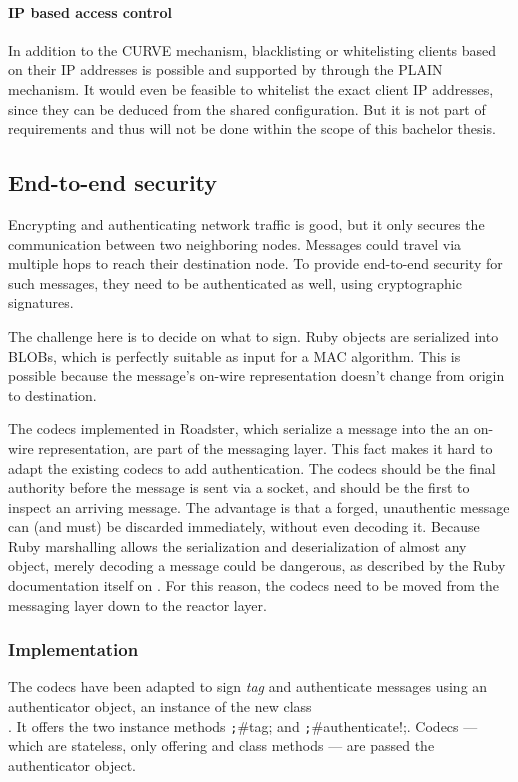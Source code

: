 \paragraph{IP based access control}
In addition to the CURVE mechanism, blacklisting or whitelisting clients based
on their \gls{IP} addresses is possible and supported by
 through the PLAIN mechanism. It would even be
feasible to whitelist the exact client IP addresses, since they can be deduced
from the shared configuration. But it is not part of requirements and thus will not
be done within the scope of this bachelor thesis.


\subsection{End-to-end security}
Encrypting and authenticating network traffic is good, but it only secures the
communication between two neighboring nodes. Messages could travel via multiple
hops to reach their destination node. To provide end-to-end security for such
messages, they need to be authenticated as well, using cryptographic
signatures.

The challenge here is to decide on what to sign. Ruby objects are serialized
into \glspl{BLOB}, which is perfectly suitable as input for a \gls{MAC} algorithm.
This is possible because the message's on-wire
representation doesn't change from origin to destination.

The codecs implemented in Roadster, which serialize a message into the an
on-wire representation, are part of the messaging layer. This fact makes it
hard to adapt the existing codecs to add authentication. The codecs should be
the final authority before the message is sent via a socket, and should be the
first to inspect an arriving message. The advantage is that a forged,
unauthentic message can (and must) be discarded immediately, without even
decoding it.  Because Ruby marshalling allows the serialization and
deserialization of almost any object, merely decoding a message could be
dangerous, as described by the Ruby documentation itself on \cite[Security
considerations]{rb:doc:marshal}.  For this reason, the codecs need to be moved
from the messaging layer down to the reactor layer.


\subsubsection{Implementation}
The codecs have been adapted to sign \emph{tag} and authenticate messages using
an authenticator object, an instance of the
new class\\. It offers the two
instance methods \texttt;#tag; and \texttt;#authenticate!;.
Codecs --- which are stateless, only offering  and 
class methods --- are passed the authenticator object.

